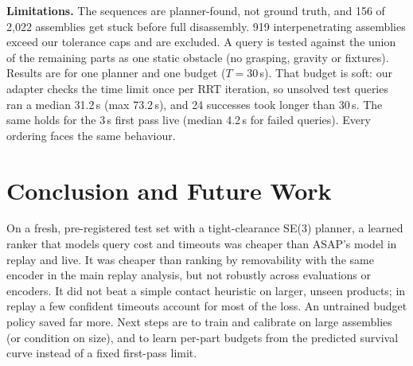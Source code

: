 \documentclass[conference]{IEEEtran}
\begin{document}
\textbf{Limitations.} The sequences are planner-found, not ground truth, and 156 of 2{,}022 assemblies get stuck
before full disassembly. 919 interpenetrating assemblies exceed our tolerance caps and are excluded. A query is tested
against the union of the remaining parts as one static obstacle (no grasping, gravity or fixtures). Results are for one
planner and one budget ($T=30$\,s). That budget is soft: our adapter checks the time limit once per RRT iteration, so
unsolved test queries ran a median 31.2\,s (max 73.2\,s), and 24 successes took longer than 30\,s. The same holds for
the 3\,s first pass live (median 4.2\,s for failed queries). Every ordering faces the same behaviour.

\section{Conclusion and Future Work}
\label{sec:concl}
On a fresh, pre-registered test set with a tight-clearance SE(3) planner, a learned ranker that models query cost
and timeouts was cheaper than ASAP's model in replay and live. It was cheaper than ranking by removability with the
same encoder in the main replay analysis, but not robustly across evaluations or encoders. It did not beat a simple
contact heuristic on larger, unseen products; in replay a few confident timeouts account for most of the loss. An
untrained budget policy saved far more. Next steps are to train and calibrate on large assemblies (or condition on size), and to
learn per-part budgets from the predicted survival curve instead of a fixed first-pass limit.



\end{document}
